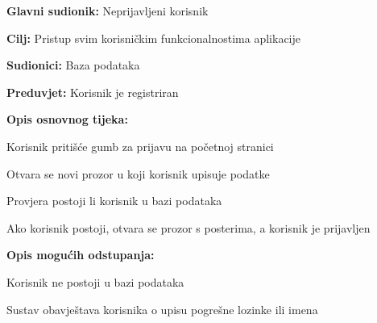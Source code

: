					\noindent {}
					\begin{packed_item}
						
						\item \textbf{Glavni sudionik: } Neprijavljeni korisnik
						\item  \textbf{Cilj:} Pristup svim korisničkim funkcionalnostima aplikacije
						\item  \textbf{Sudionici:} Baza podataka
						\item  \textbf{Preduvjet:} Korisnik je registriran
						\item  \textbf{Opis osnovnog tijeka:}
						
						\item[] \begin{packed_enum}
							
							\item Korisnik pritišće gumb za prijavu na početnoj stranici
							\item Otvara se novi prozor u koji korisnik upisuje podatke
							\item Provjera postoji li korisnik u bazi podataka
							\item Ako korisnik postoji, otvara se prozor s posterima, a korisnik je prijavljen
						\end{packed_enum}
						
						\item  \textbf{Opis mogućih odstupanja:}
						
						\item[] \begin{packed_item}
							
							\item[4.a] Korisnik ne postoji u bazi podataka
							\item[] \begin{packed_enum}
								
								\item Sustav obavještava korisnika o upisu pogrešne lozinke ili imena
								
							\end{packed_enum}
							
						\end{packed_item}
					\end{packed_item}	
					
